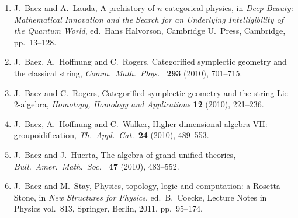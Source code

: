 \documentclass[12pt]{amsart}
\begin{document}
\begin{enumerate}

\item J.\ Baez and A.\ Lauda, A prehistory of $n$-categorical physics, in {\sl Deep Beauty: Mathematical Innovation and the Search  for an Underlying Intelligibility of the Quantum World}, ed.\ Hans Halvorson, Cambridge U.\ Press, Cambridge, pp.\ 13--128.

\item J.\ Baez, A.\ Hoffnung and C.\ Rogers, Categorified symplectic geometry and the classical string, \textsl{Comm.\ Math.\ Phys.\  } {\bf 293} (2010), 701--715. 

\item J.\ Baez and C.\ Rogers, Categorified symplectic geometry and the string Lie 2-algebra,  {\sl Homotopy, Homology
and Applications} {\bf 12} (2010), 221--236.

\item J.\ Baez, A.\ Hoffnung and C.\ Walker,  Higher-dimensional algebra VII: groupoidification, {\sl Th.\ Appl.\ Cat.\ }{\bf 24} 
(2010), 489--553.

\item J.\ Baez and J.\ Huerta, The algebra of grand unified theories, \textsl{ Bull.\ Amer.\ Math.\ Soc.\ }{\bf 
47} (2010), 483--552.

\item J.\ Baez and M.\ Stay, Physics, topology, logic and computation: a Rosetta Stone, in {\sl New Structures for Physics}, ed.\ B.\ Coecke, Lecture Notes in Physics vol.\ 813, Springer, Berlin, 2011, pp.\ 95--174.

\end{enumerate}

\vfill

\pagebreak
\pagestyle{empty}
\end{document}
